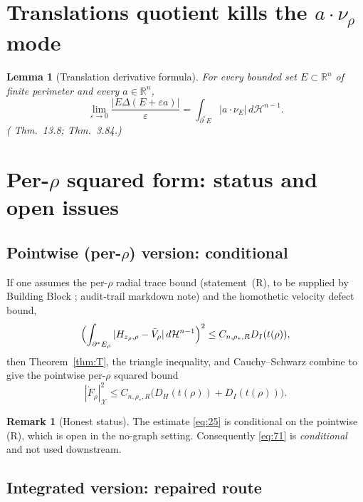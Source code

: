 \documentclass[11pt]{article}
\newtheorem{lemma}[theorem]{Lemma}
\theoremstyle{definition}
\newtheorem{remark}[theorem]{Remark}
\newcommand{\R}{\mathbb{R}}
\newcommand{\eps}{\varepsilon}
\newcommand{\rstar}{\rho_{*}}
\newcommand{\X}{\mathcal X}
\begin{document}
\section{Translations quotient kills the $a\cdot\nu_\rho$ mode}\label{sec:trans}

\begin{lemma}[Translation derivative formula]\label{lem:trans-deriv}
For every bounded set $E\subset\R^n$ of finite perimeter and every
$a\in\R^n$,
\begin{equation}\label{eq:trans-deriv}
   \lim_{\eps\to 0}\frac{|E\Delta(E+\eps a)|}{\eps}
   =\int_{\partial^*E}|a\cdot\nu_E|\,d\mathcal H^{n-1}.
\end{equation}
(\cite{Maggi2012} Thm.~13.8; \cite{AFP2000} Thm.~3.84.)
\end{lemma}

\section{Per-$\rho$ squared form: status and open issues}\label{sec:open}

\subsection{Pointwise (per-$\rho$) version: conditional}

If one assumes the per-$\rho$ radial trace bound (statement~(R), to be
supplied by Building Block \cite{WeightedMetricTrace}; audit-trail markdown
note) and the homothetic velocity defect bound,
\begin{equation}\label{eq:25}
   \Bigl(\int_{\partial^*E_\rho}|H_{z_\rho,\rho}-\bar V_\rho|
   \,d\mathcal H^{n-1}\Bigr)^2\le C_{n,\rstar,R}D_I(t(\rho)),
\end{equation}
then Theorem~\ref{thm:T}, the triangle inequality, and Cauchy--Schwarz
combine to give the pointwise per-$\rho$ squared bound
\begin{equation}\label{eq:71}
   |\dot F_\rho|_\X^2\le C_{n,\rstar,R}\bigl(D_H(t(\rho))+D_I(t(\rho))\bigr).
\end{equation}

\begin{remark}[Honest status]\label{rem:status}
The estimate \eqref{eq:25} is conditional on the pointwise (R), which is
open in the no-graph setting. Consequently \eqref{eq:71} is \emph{conditional}
and not used downstream.
\end{remark}

\subsection{Integrated version: repaired route}
\end{document}
